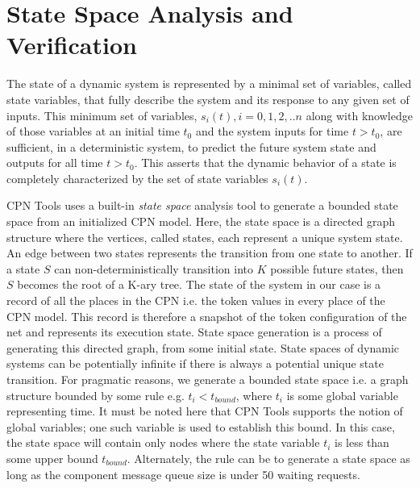 \chapter{State Space Analysis and Verification}
\label{chapter:analysis}

The state of a dynamic system is represented by a minimal set of variables, called state variables, that fully describe the system and its response to any given set of inputs. This minimum set of variables, $s_i(t), i=0,1,2,..n$ along with knowledge of those variables at an initial time $t_0$ and the system inputs for time $t > t_0$, are sufficient, in a deterministic system, to predict the future system state and outputs for all time $t > t_0$. This asserts that the dynamic behavior of a state is completely characterized by the set of state variables $s_i(t)$. 

CPN Tools uses a built-in \emph{state space} analysis tool to generate a bounded state space from an initialized CPN model. Here, the state space is a directed graph structure where the vertices, called states, each represent a unique system state. An edge between two states represents the transition from one state to another. If a state $S$ can non-deterministically transition into $K$ possible future states, then $S$ becomes the root of a K-ary tree. The state of the system in our case is a record of all the places in the CPN i.e. the token values in every place of the CPN model. This record is therefore a snapshot of the token configuration of the net and represents its execution state. State space generation is a process of generating this directed graph, from some initial state. State spaces of dynamic systems can be potentially infinite if there is always a potential unique state transition. For pragmatic reasons, we generate a bounded state space i.e. a graph structure bounded by some rule e.g. $t_i < t_{bound}$, where $t_i$ is some global variable representing time. It must be noted here that CPN Tools supports the notion of global variables; one such variable is used to establish this bound. In this case, the state space will contain only nodes where the state variable $t_i$ is less than some upper bound $t_{bound}$. Alternately, the rule can be to generate a state space as long as the component message queue size is under 50 waiting requests. 

